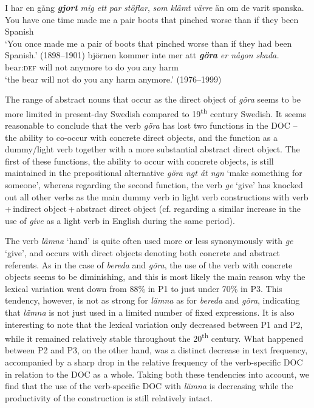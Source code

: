 \documentclass[output=paper]{langscibook}
\begin{document}
\ea \label{ex:valdeson:10}
\gll I       har  en  gång \textbf{\textit{gjort}} \textit{mig}  \textit{ett} \textit{par} \textit{stöflar},  \textit{som}  \textit{klämt}   \textit{värre} än      om  de   varit  spanska.\\
  You    have    one   time  made  me  a    pair  boots    that  pinched worse than    if        they    been  Spanish \\
\glt ‘You once made me a pair of boots that pinched worse than if they had been Spanish.’ (1898–1901)
\ex \label{ex:valdeson:11}
\gll björnen  kommer  inte    mer      att \textbf{\textit{göra}} \textit{er    någon  skada.}\\
  bear:\textsc{def}         will        not  anymore     to  do      you  any     harm\\
\glt `the bear will not do you any harm anymore.’ (1976–1999)
\z


The range of abstract nouns that occur as the direct object of \textit{göra} seems to be more limited in present-day Swedish compared to 19\textsuperscript{th} century Swedish. It seems reasonable to conclude that the verb \textit{göra} has lost two functions in the DOC – the ability to co-occur with concrete direct objects, and the function as a dummy/light verb together with a more substantial abstract direct object. The first of these functions, the ability to occur with concrete objects, is still maintained in the prepositional alternative \textit{göra ngt åt ngn} ‘make something for someone’, whereas regarding the second function, the verb \textit{ge} ‘give’ has knocked out all other verbs as the main dummy verb in light verb constructions with verb\,+\,indirect object\,+\,abstract direct object (cf. \citealt{Sundquist2020} regarding a similar increase in the use of \textit{give} as a light verb in English during the same period).



\label{sec:valdeson:5.3.1.3}



The verb \textit{lämna} ‘hand’ is quite often used more or less synonymously with \textit{ge} ‘give’, and occurs with direct objects denoting both concrete and abstract referents. As in the case of \textit{bereda} and \textit{göra}, the use of the verb with concrete objects seems to be diminishing, and this is most likely the main reason why the lexical variation went down from 88\% in P1 to just under 70\% in P3. This tendency, however, is not as strong for \textit{lämna} as for \textit{bereda} and \textit{göra}, indicating that \textit{lämna} is not just used in a limited number of fixed expressions. It is also interesting to note that the lexical variation only decreased between P1 and P2, while it remained relatively stable throughout the 20\textsuperscript{th} century. What happened between P2 and P3, on the other hand, was a distinct decrease in text frequency, accompanied by a sharp drop in the relative frequency of the verb-specific DOC in relation to the DOC as a whole. Taking both these tendencies into account, we find that the use of the verb-specific DOC with \textit{lämna} is decreasing while the productivity of the construction is still relatively intact.
\end{document}
